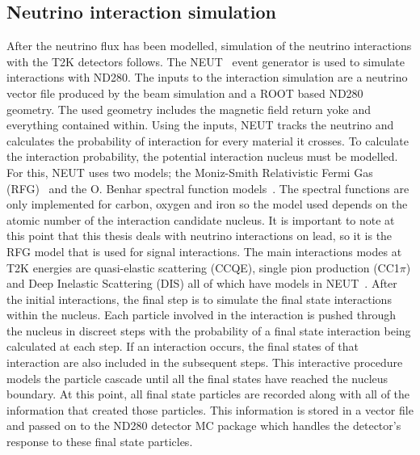 \subsection{Neutrino interaction simulation}
\label{subsec:NeutrinoInteractionSimulation}
After the neutrino flux has been modelled, simulation of the neutrino interactions with the T2K detectors follows.  The NEUT~\cite{Hayato2002171} event generator is used to simulate interactions with ND280.  The inputs to the interaction simulation are a neutrino vector file produced by the beam simulation and a ROOT based ND280 geometry.  The used geometry includes the magnetic field return yoke and everything contained within.  Using the inputs, NEUT tracks the neutrino and calculates the probability of interaction for every material it crosses.  To calculate the interaction probability, the potential interaction nucleus must be modelled.  For this, NEUT uses two models; the Moniz-Smith Relativistic Fermi Gas (RFG)~\cite{Miller2002223} and the O. Benhar spectral function models~\cite{Benhar1994493}.  The spectral functions are only implemented for carbon, oxygen and iron so the model used depends on the atomic number of the interaction candidate nucleus.  It is important to note at this point that this thesis deals with neutrino interactions on lead, so it is the RFG model that is used for signal interactions.
\newline 
\newline
The main interactions modes at T2K energies are quasi-elastic scattering (CCQE), single pion production  (CC1$\pi$) and Deep Inelastic Scattering (DIS) all of which have models in NEUT~\cite{LlewellynSmith1972261,Rein198179,1126-6708-2006-05-026}.
\newline
\newline
After the initial interactions, the final step is to simulate the final state interactions within the nucleus.  Each particle involved in the interaction is pushed through the nucleus in discreet steps with the probability of a final state interaction being calculated at each step.  If an interaction occurs, the final states of that interaction are also included in the subsequent steps.  This interactive procedure models the particle cascade until all the final states have reached the nucleus boundary.  At this point, all final state particles are recorded along with all of the information that created those particles.  This information is stored in a vector file and passed on to the ND280 detector MC package which handles the detector's response to these final state particles.
